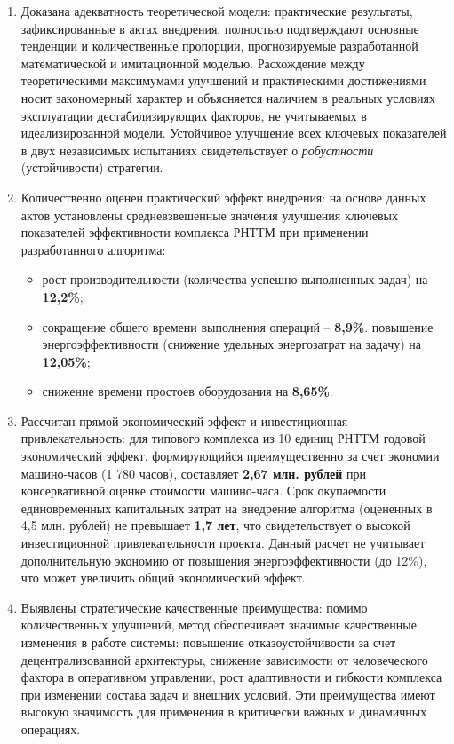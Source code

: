 \begin{enumerate}[beginpenalty=10000, midpenalty=10000, wide=\parindent, leftmargin=0pt]
\item Доказана адекватность теоретической модели: практические результаты, зафиксированные в актах внедрения, полностью подтверждают основные тенденции и количественные пропорции, прогнозируемые разработанной математической и имитационной моделью. Расхождение между теоретическими максимумами улучшений и практическими достижениями носит закономерный характер и объясняется наличием в реальных условиях эксплуатации дестабилизирующих факторов, не учитываемых в идеализированной модели. Устойчивое улучшение всех ключевых показателей в двух независимых испытаниях свидетельствует о \emph{робустности} (устойчивости) стратегии.

\item Количественно оценен практический эффект внедрения: на основе данных актов установлены средневзвешенные значения улучшения ключевых показателей эффективности комплекса РНТТМ при применении разработанного алгоритма:
	\begin{itemize}[beginpenalty=10000, midpenalty=10000, wide=\parindent, leftmargin=0pt]
		\item рост производительности (количества успешно выполненных задач) на \textbf{12,2\%};
		\item сокращение общего времени выполнения операций -- \textbf{8,9\%}.
		повышение энергоэффективности (снижение удельных энергозатрат на задачу) на \textbf{12,05\%};
		\item снижение времени простоев оборудования на \textbf{8,65\%}.
	\end{itemize}

\item Рассчитан прямой экономический эффект и инвестиционная привлекательность: для типового комплекса из 10 единиц РНТТМ годовой экономический эффект, формирующийся преимущественно за счет экономии машино-часов (1 780 часов), составляет \textbf{2,67 млн. рублей} при консервативной оценке стоимости машино-часа. Срок окупаемости единовременных капитальных затрат на внедрение алгоритма (оцененных в 4,5 млн. рублей) не превышает \textbf{1,7 лет}, что свидетельствует о высокой инвестиционной привлекательности проекта. Данный расчет не учитывает дополнительную экономию от повышения энергоэффективности (до 12\%), что может увеличить общий экономический эффект.

\item Выявлены стратегические качественные преимущества: помимо количественных улучшений, метод обеспечивает значимые качественные изменения в работе системы: повышение отказоустойчивости за счет децентрализованной архитектуры, снижение зависимости от человеческого фактора в оперативном управлении, рост адаптивности и гибкости комплекса при изменении состава задач и внешних условий. Эти преимущества имеют высокую значимость для применения в критически важных и динамичных операциях.


\end{enumerate}
